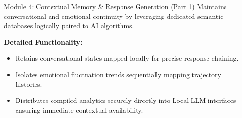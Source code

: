 \documentclass{beamer}
\begin{document}
\begin{frame}{Module 4: Contextual Memory \& Response Generation (Part 1)}
Maintains conversational and emotional continuity by leveraging dedicated semantic databases logically paired to AI algorithms.

\vspace{0.3cm}
\textbf{Detailed Functionality:}
\begin{itemize}
    \item Retains conversational states mapped locally for precise response chaining.
    \item Isolates emotional fluctuation trends sequentially mapping trajectory histories.
    \item Distributes compiled analytics securely directly into Local LLM interfaces ensuring immediate contextual availability.
\end{itemize}
\end{frame}
\end{document}
